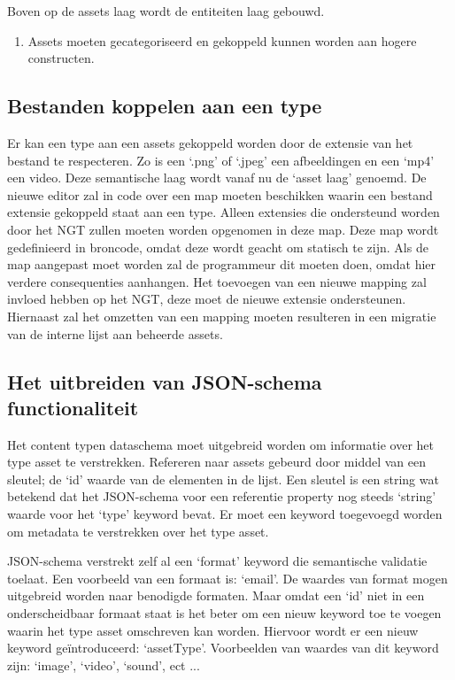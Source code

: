 Boven op de assets laag wordt de entiteiten laag gebouwd.

\begin{enumerate}[resume]
    \item Assets moeten gecategoriseerd en gekoppeld kunnen worden aan hogere constructen.
\end{enumerate}

\subsection{Bestanden koppelen aan een type}
Er kan een type aan een assets gekoppeld worden door de extensie van het bestand te respecteren. Zo is een ‘.png’ of ‘.jpeg’ een afbeeldingen en een ‘mp4’ een video. Deze semantische laag wordt vanaf nu de ‘asset laag’ genoemd. De nieuwe editor zal in code over een map moeten beschikken waarin een bestand extensie gekoppeld staat aan een type. Alleen extensies die ondersteund worden door het NGT zullen moeten worden opgenomen in deze map. Deze map wordt gedefinieerd in broncode, omdat deze wordt geacht om statisch te zijn. Als de map aangepast moet worden zal de programmeur dit moeten doen, omdat hier verdere consequenties aanhangen. Het toevoegen van een nieuwe mapping zal invloed hebben op het NGT, deze moet de nieuwe extensie ondersteunen. Hiernaast zal het omzetten van een mapping moeten resulteren in een migratie van de interne lijst aan beheerde assets.

\subsection{Het uitbreiden van JSON-schema functionaliteit}
Het content typen dataschema moet uitgebreid worden om informatie over het type asset te verstrekken. Refereren naar assets gebeurd door middel van een sleutel; de ‘id’ waarde van de elementen in de lijst. Een sleutel is een string wat betekend dat het JSON-schema voor een referentie property nog steeds ‘string’ waarde voor het ‘type’ keyword bevat. Er moet een keyword toegevoegd worden om metadata te verstrekken over het type asset.

JSON-schema verstrekt zelf al een ‘format’ keyword die semantische validatie toelaat. Een voorbeeld van een formaat is: ‘email’\cite{Droettboom2016}. De waardes van format mogen uitgebreid worden naar benodigde formaten. Maar omdat een ‘id’ niet in een onderscheidbaar formaat staat is het beter om een nieuw keyword toe te voegen waarin het type asset omschreven kan worden. Hiervoor wordt er een nieuw keyword geïntroduceerd: ‘assetType’. Voorbeelden van waardes van dit keyword zijn: ‘image’, ‘video’, ‘sound’, ect ...

